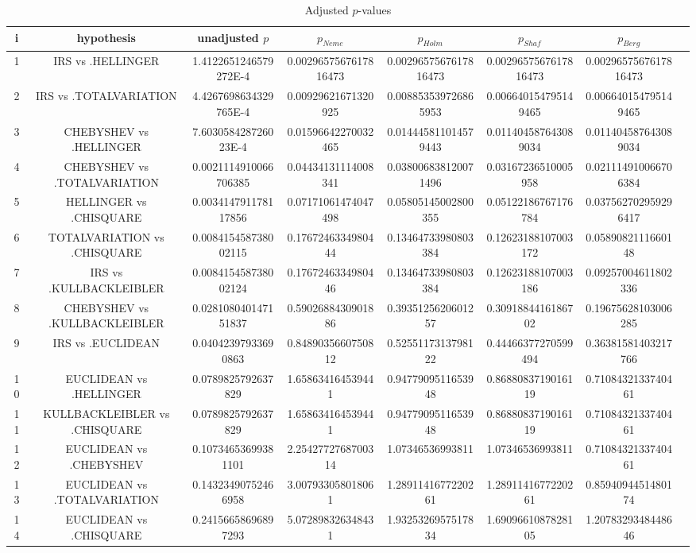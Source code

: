 \documentclass[a4paper,10pt]{article}
\begin{document}
\begin{landscape}
\begin{table}[!htp]
\centering\tiny
\caption{Adjusted $p$-values}
\begin{tabular}{cccccccc}
i&hypothesis&unadjusted $p$&$p_{Neme}$&$p_{Holm}$&$p_{Shaf}$&$p_{Berg}$\\
\hline
1&IRS vs .HELLINGER&1.4122651246579272E-4&0.0029657567617816473&0.0029657567617816473&0.0029657567617816473&0.0029657567617816473\\
2&IRS vs .TOTALVARIATION&4.4267698634329765E-4&0.00929621671320925&0.008853539726865953&0.006640154795149465&0.006640154795149465\\
3&CHEBYSHEV vs .HELLINGER&7.603058428726023E-4&0.01596642270032465&0.014445811014579443&0.011404587643089034&0.011404587643089034\\
4&CHEBYSHEV vs .TOTALVARIATION&0.0021114910066706385&0.04434131114008341&0.038006838120071496&0.03167236510005958&0.021114910066706384\\
5&HELLINGER vs .CHISQUARE&0.003414791178117856&0.07171061474047498&0.05805145002800355&0.05122186767176784&0.037562702959296417\\
6&TOTALVARIATION vs .CHISQUARE&0.008415458738002115&0.1767246334980444&0.13464733980803384&0.12623188107003172&0.0589082111660148\\
7&IRS vs .KULLBACKLEIBLER&0.008415458738002124&0.1767246334980446&0.13464733980803384&0.12623188107003186&0.09257004611802336\\
8&CHEBYSHEV vs .KULLBACKLEIBLER&0.028108040147151837&0.5902688430901886&0.3935125620601257&0.3091884416186702&0.19675628103006285\\
9&IRS vs .EUCLIDEAN&0.04042397933690863&0.8489035660750812&0.5255117313798122&0.44466377270599494&0.36381581403217766\\
10&EUCLIDEAN vs .HELLINGER&0.0789825792637829&1.658634164539441&0.9477909511653948&0.8688083719016119&0.7108432133740461\\
11&KULLBACKLEIBLER vs .CHISQUARE&0.0789825792637829&1.658634164539441&0.9477909511653948&0.8688083719016119&0.7108432133740461\\
12&EUCLIDEAN vs .CHEBYSHEV&0.10734653699381101&2.2542772768700314&1.07346536993811&1.07346536993811&0.7108432133740461\\
13&EUCLIDEAN vs .TOTALVARIATION&0.14323490752466958&3.007933058018061&1.2891141677220261&1.2891141677220261&0.8594094451480174\\
14&EUCLIDEAN vs .CHISQUARE&0.24156658696897293&5.072898326348431&1.9325326957517834&1.6909661087828105&1.2078329348448646\\

\end{tabular}
\end{table}
\end{landscape}
\end{document}
